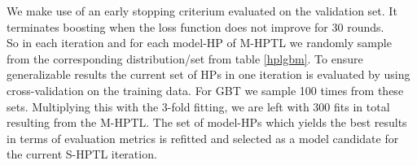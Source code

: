 \documentclass[12pt,titlepage]{article}
\begin{document}
\noindent
We make use of an early stopping criterium evaluated on the validation set. It terminates boosting when the loss function does not improve for 30 rounds. \\
So in each iteration and for each model-HP of M-HPTL we randomly sample from the corresponding distribution/set from table \ref{hplgbm}. To ensure generalizable results the current set of HPs in one iteration is evaluated by using cross-validation on the training data. For GBT we sample 100 times from these sets. Multiplying this with the 3-fold fitting, we are left with 300 fits in total resulting from the M-HPTL. The set of model-HPs which yields the best results in terms of evaluation metrics is refitted and selected as a model candidate for the current S-HPTL iteration. \\
\end{document}
